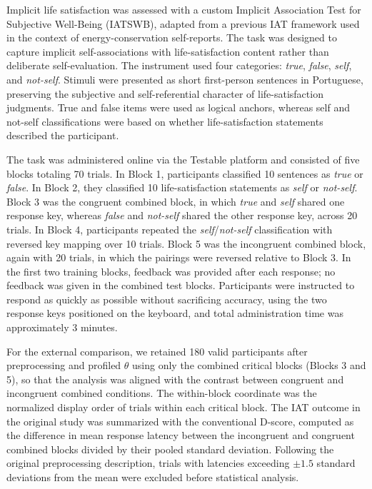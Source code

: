 \documentclass[12pt]{article}
\begin{document}
Implicit life satisfaction was assessed with a custom Implicit Association Test for Subjective Well-Being (IATSWB), adapted from a previous IAT framework used in the context of energy-conservation self-reports. The task was designed to capture implicit self-associations with life-satisfaction content rather than deliberate self-evaluation. The instrument used four categories: \emph{true}, \emph{false}, \emph{self}, and \emph{not-self}. Stimuli were presented as short first-person sentences in Portuguese, preserving the subjective and self-referential character of life-satisfaction judgments. True and false items were used as logical anchors, whereas self and not-self classifications were based on whether life-satisfaction statements described the participant.

The task was administered online via the Testable platform and consisted of five blocks totaling 70 trials. In Block 1, participants classified 10 sentences as \emph{true} or \emph{false}. In Block 2, they classified 10 life-satisfaction statements as \emph{self} or \emph{not-self}. Block 3 was the congruent combined block, in which \emph{true} and \emph{self} shared one response key, whereas \emph{false} and \emph{not-self} shared the other response key, across 20 trials. In Block 4, participants repeated the \emph{self}/\emph{not-self} classification with reversed key mapping over 10 trials. Block 5 was the incongruent combined block, again with 20 trials, in which the pairings were reversed relative to Block 3. In the first two training blocks, feedback was provided after each response; no feedback was given in the combined test blocks. Participants were instructed to respond as quickly as possible without sacrificing accuracy, using the two response keys positioned on the keyboard, and total administration time was approximately 3 minutes.

For the external comparison, we retained 180 valid participants after preprocessing and profiled $\theta$ using only the combined critical blocks (Blocks 3 and 5), so that the analysis was aligned with the contrast between congruent and incongruent combined conditions. The within-block coordinate was the normalized display order of trials within each critical block. The IAT outcome in the original study was summarized with the conventional D-score, computed as the difference in mean response latency between the incongruent and congruent combined blocks divided by their pooled standard deviation. Following the original preprocessing description, trials with latencies exceeding $\pm 1.5$ standard deviations from the mean were excluded before statistical analysis.
\end{document}
